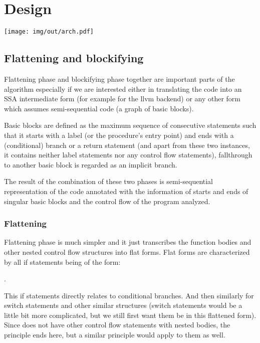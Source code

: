 \providecommand{\mbb}[1]{\mathbb{#1}}
\providecommand{\pipe}{\ |\ }
\providecommand{\mcal}{\mathcal}
\providecommand{\tit}{\textit}

\chapter{Design}



\texttt{[image: img/out/arch.pdf]}

\section{Flattening and blockifying}

Flattening phase and blockifying phase together are important parts of the algorithm especially if we are interested either in translating the code into an SSA intermediate form (for example for the llvm backend) or any other form which assumes semi-sequential code (a graph of basic blocks).

Basic blocks are defined as the maximum sequence of consecutive statements such that it starts with a label (or the procedure's entry point) and ends with a (conditional) branch or a return statement (and apart from these two instances, it contains neither label statements nor any control flow statements), fallthrough to another basic block is regarded as an implicit branch.

The result of the combination of these two phases is semi-sequential representation of the code annotated with the information of starts and ends of singular basic blocks and the control flow of the program analyzed.

\subsection{Flattening}

Flattening phase is much simpler and it just transcribes the function bodies and other nested control flow structures into flat forms. Flat forms are characterized by all if statements being of the form:

.

This if statements directly relates to conditional branches. And then similarly for switch statements and other similar structures (switch statements would be a little bit more complicated, but we still first want them be in this flattened form). Since \cmm does not have other control flow statements with nested bodies, the principle ends here, but a similar principle would apply to them as well.

